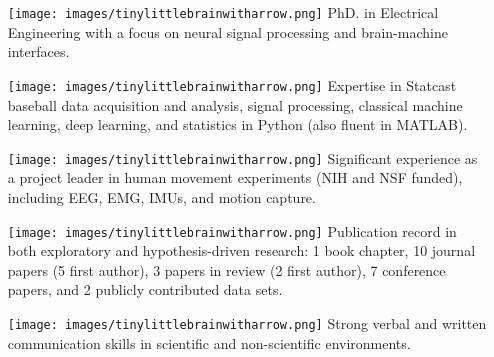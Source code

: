     \begin{adjustwidth}{0.5em}{0pt}
    \begin{itemize}
        \item[\texttt{[image: images/tinylittlebrainwitharrow.png]}] PhD. in Electrical Engineering with a focus on neural signal processing and brain-machine interfaces.
        \item[\texttt{[image: images/tinylittlebrainwitharrow.png]}] Expertise in Statcast baseball data acquisition and analysis, signal processing, classical machine learning, deep learning, and statistics in Python (also fluent in MATLAB).
        \item[\texttt{[image: images/tinylittlebrainwitharrow.png]}] Significant experience as a project leader in human movement experiments (NIH and NSF funded), including EEG, EMG, IMUs, and motion capture. 
        \item[\texttt{[image: images/tinylittlebrainwitharrow.png]}] Publication record in both exploratory and hypothesis-driven research: 1 book chapter, 10 journal papers (5 first author), 3 papers in review (2 first author), 7 conference papers, and 2 publicly contributed data sets.
        \item[\texttt{[image: images/tinylittlebrainwitharrow.png]}] Strong verbal and written communication skills in scientific and non-scientific environments.
    \end{itemize}
    \end{adjustwidth}